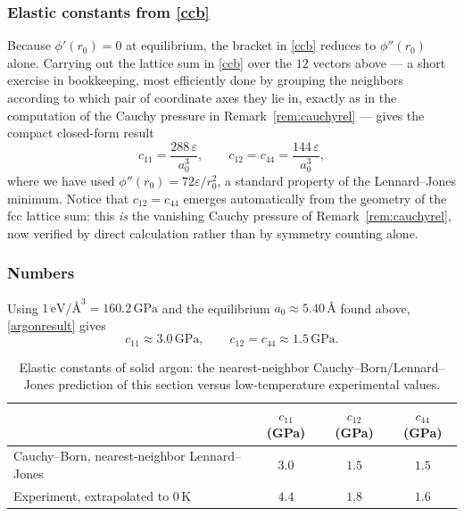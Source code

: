 \subsubsection*{Elastic constants from \texorpdfstring{\eqref{ccb}}{the elasticity formula}}

Because $\phi'(r_0)=0$ at equilibrium, the bracket in \eqref{ccb} reduces to $\phi''(r_0)$ alone. Carrying out the lattice sum in \eqref{ccb} over the $12$ vectors above --- a short exercise in bookkeeping, most efficiently done by grouping the neighbors according to which pair of coordinate axes they lie in, exactly as in the computation of the Cauchy pressure in Remark~\ref{rem:cauchyrel} --- gives the compact closed-form result
\begin{equation}\label{argonresult}
	c_{11} = \frac{288\,\varepsilon}{a_0^3}, \qquad c_{12}=c_{44} = \frac{144\,\varepsilon}{a_0^3},
\end{equation}
where we have used $\phi''(r_0) = 72\varepsilon/r_0^2$, a standard property of the Lennard--Jones minimum. Notice that $c_{12}=c_{44}$ emerges automatically from the geometry of the fcc lattice sum: this \textit{is} the vanishing Cauchy pressure of Remark~\ref{rem:cauchyrel}, now verified by direct calculation rather than by symmetry counting alone.

\subsubsection*{Numbers}

Using $1\,\mathrm{eV}/\text{\AA}^3 = 160.2\,\mathrm{GPa}$ and the equilibrium $a_0\approx5.40\,\text{\AA}$ found above, \eqref{argonresult} gives
\begin{equation}
	c_{11}\approx 3.0\,\mathrm{GPa}, \qquad c_{12}=c_{44}\approx1.5\,\mathrm{GPa}.
\end{equation}

\begin{table}[htbp]
	\centering
	\begin{tabular}{lccc}
		\toprule
		& $c_{11}$ (GPa) & $c_{12}$ (GPa) & $c_{44}$ (GPa) \\
		\midrule
		Cauchy--Born, nearest-neighbor Lennard--Jones & $3.0$ & $1.5$ & $1.5$ \\
		Experiment, extrapolated to $0\,\mathrm{K}$ \cite{KeelerBatchelder1970} & $4.4$ & $1.8$ & $1.6$ \\
		\bottomrule
	\end{tabular}
	\caption{Elastic constants of solid argon: the nearest-neighbor Cauchy--Born/Lennard--Jones prediction of this section versus low-temperature experimental values.}
	\label{tab:argon}
\end{table}


